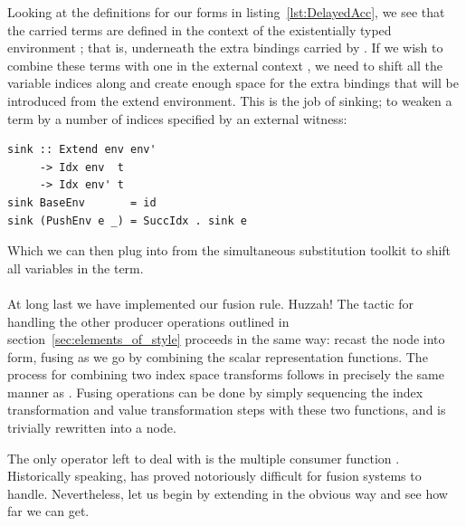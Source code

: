 Looking at the definitions for our  forms in
listing~\ref{lst:DelayedAcc}, we see that the carried terms are defined in the
context of the existentially typed environment ; that is,
underneath the extra bindings carried by . If we wish to combine
these terms with one in the external context , we need to shift all
the variable indices along and create enough space for the extra bindings that
will be introduced from the extend environment. This is the job of sinking; to
weaken a term by a number of indices specified by an external witness:
%
\begin{lstlisting}[style=haskell]
sink :: Extend env env'
     -> Idx env  t
     -> Idx env' t
sink BaseEnv       = id
sink (PushEnv e _) = SuccIdx . sink e
\end{lstlisting}
%
Which we can then plug into  from the simultaneous substitution
toolkit to shift all variables in the term.
%


\paragraph{}

At long last we have implemented our  fusion rule. Huzzah! The
tactic for handling the other producer operations outlined in
section~\ref{sec:elements_of_style} proceeds in the same way: recast the node
into  form, fusing as we go by combining the scalar
representation functions. The process for combining two index space transforms
follows in precisely the same manner as . Fusing 
operations can be done by simply sequencing the index transformation and value
transformation steps with these two functions, and  is trivially
rewritten into a  node.

The only operator left to deal with is the multiple consumer function
. Historically speaking,  has proved notoriously
difficult for fusion systems to handle. Nevertheless, let us begin by extending
 in the obvious way and see how far we can get.

